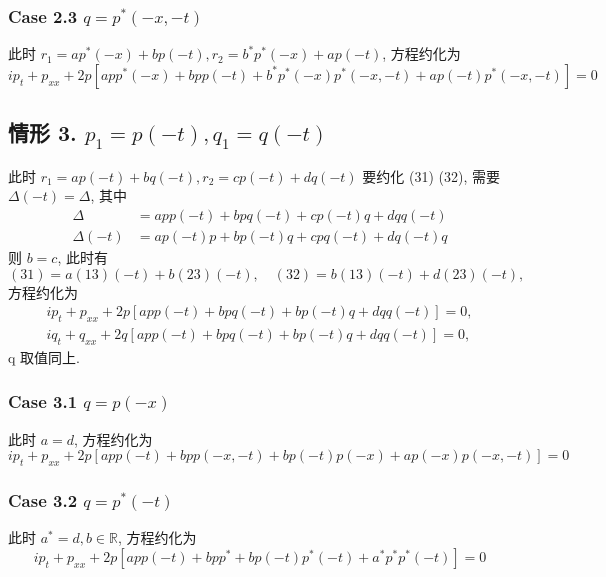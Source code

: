 \subsubsection*{Case 2.3 $ q = p^{*}(-x,-t) $}
此时 $r_1 = ap^{*}(-x) + bp(-t), r_2 = b^{*}p^{*}(-x) + ap(-t) $, 方程约化为
\begin{equation}
    ip_t + p_{xx} + 2p \left[ app^{*}(-x) + bpp(-t) + b^{*}p^{*}(-x)p^{*}(-x,-t) + ap(-t)p^{*}(-x,-t) \right] = 0
\end{equation}

\subsection*{情形 3. $ p_1 = p(-t), q_1 = q(-t) $}
此时 $r_1 = ap(-t) + bq(-t), r_2 = cp(-t) + dq(-t)$
要约化 (31) (32), 需要 $ \Delta(-t) = \Delta $, 其中
\begin{equation}
    \begin{aligned}
        \Delta     & = app(-t) + bpq(-t) + cp(-t)q + dqq(-t) \\
        \Delta(-t) & = ap(-t)p + bp(-t)q + cpq(-t) + dq(-t)q
    \end{aligned}
\end{equation}
则 $ b=c $, 此时有
\begin{equation}
    (31) = a(13)(-t) + b(23)(-t), \quad
    (32) = b(13)(-t) + d(23)(-t),
\end{equation}
方程约化为
\begin{align}
    ip_{t} + p_{xx} + 2p \left[ app(-t) + bpq(-t) + bp(-t)q + dqq(-t) \right] = 0, \label{ch4-eq-reduction-inverse-t-p} \\
    iq_{t} + q_{xx} + 2q \left[ app(-t) + bpq(-t) + bp(-t)q + dqq(-t) \right] = 0, \label{ch4-eq-reduction-inverse-t-q}
\end{align}
q 取值同上.

\subsubsection*{Case 3.1 $ q = p(-x) $}
此时 $ a = d $, 方程约化为
\begin{equation}
    ip_t + p_{xx} + 2p \left[ app(-t) + bpp(-x,-t) + bp(-t)p(-x) + ap(-x)p(-x,-t) \right] = 0
\end{equation}

\subsubsection*{Case 3.2 $ q = p^{*}(-t) $}
此时 $ a^{*} = d, b \in \mathbb{R} $, 方程约化为
\begin{equation}
    ip_t + p_{xx} + 2p \left[ app(-t) + bpp^{*} + bp(-t)p^{*}(-t) + a^{*}p^{*}p^{*}(-t) \right] = 0
\end{equation}

